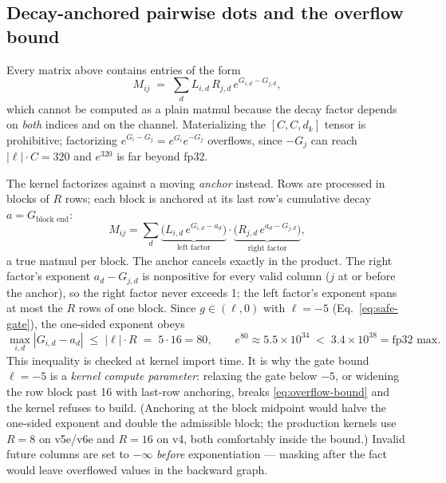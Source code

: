 \subsection{Decay-anchored pairwise dots and the overflow bound}
\label{sec:pairwise}

Every matrix above contains entries of the form
\begin{equation}
M_{ij} \;=\; \sum_{d} L_{i,d}\, R_{j,d}\, e^{G_{i,d} - G_{j,d}},
\label{eq:pairwise}
\end{equation}
which cannot be computed as a plain matmul because the decay factor
depends on \emph{both} indices and on the channel. Materializing the
$[C, C, d_k]$ tensor is prohibitive; factorizing
$e^{G_i - G_j} = e^{G_i} e^{-G_j}$ overflows, since $-G_j$ can reach
$|\ell| \cdot C = 320$ and $e^{320}$ is far beyond fp32.

The kernel factorizes against a moving \emph{anchor} instead. Rows are
processed in blocks of $R$ rows; each block is anchored at its last
row's cumulative decay $a = G_{\text{block end}}$:
\begin{equation}
M_{ij} = \sum_d
\underbrace{\big(L_{i,d}\, e^{G_{i,d} - a_d}\big)}_{\text{left factor}}
\cdot
\underbrace{\big(R_{j,d}\, e^{a_d - G_{j,d}}\big)}_{\text{right factor}},
\end{equation}
a true matmul per block. The anchor cancels exactly in the product. The
right factor's exponent $a_d - G_{j,d}$ is nonpositive for every valid
column ($j$ at or before the anchor), so the right factor never exceeds
1; the left factor's exponent spans at most the $R$ rows of one block.
Since $g \in (\ell, 0)$ with $\ell = -5$
(Eq.~\ref{eq:safe-gate}), the one-sided exponent obeys
\begin{equation}
\max_{i,d} \left| G_{i,d} - a_d \right| \;\le\; |\ell| \cdot R
\;=\; 5 \cdot 16 = 80,
\qquad
e^{80} \approx 5.5 \times 10^{34} \;<\; 3.4 \times 10^{38} = \text{fp32 max}.
\label{eq:overflow-bound}
\end{equation}
This inequality is checked at kernel import time. It is why the gate
bound $\ell = -5$ is a \emph{kernel compute parameter}: relaxing the
gate below $-5$, or widening the row block past 16 with last-row
anchoring, breaks \eqref{eq:overflow-bound} and the kernel refuses to
build. (Anchoring at the block midpoint would halve the one-sided
exponent and double the admissible block; the production kernels use
$R = 8$ on v5e/v6e and $R = 16$ on v4, both comfortably inside the
bound.) Invalid future columns are set to $-\infty$ \emph{before}
exponentiation --- masking after the fact would leave overflowed values
in the backward graph.

